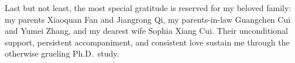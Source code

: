 \begin{acknowledgements}
Last but not least, the most special gratitude is reserved for my beloved family: my parents Xiaoquan Fan and Jiangrong Qi,
my parents-in-law Guangchen Cui and Yumei Zhang, and my dearest wife Sophia Xiang Cui.
Their unconditional support, persistent accompaniment, and consistent love
sustain me through the otherwise grueling Ph.D.~study.

%
%

%
% 
%
%
%
%

\end{acknowledgements}
